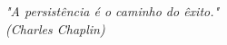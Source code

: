 \begin{epigrafe}
    \vspace*{\fill}
	\begin{flushright}
		\textit{"A persistência é o caminho do êxito."\\
		(Charles Chaplin)}
	\end{flushright}
\end{epigrafe}

